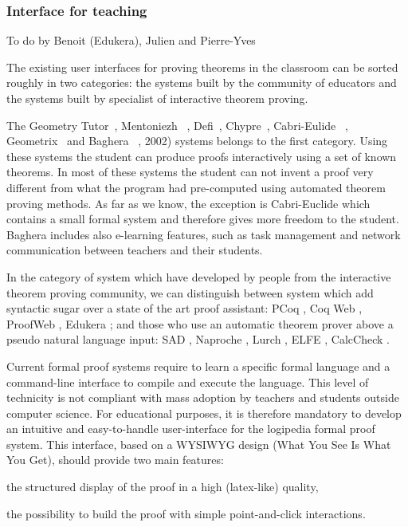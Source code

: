 \subsubsection*{Interface for teaching}

{\color{red} To do by Benoit (Edukera), Julien and Pierre-Yves}

The existing user interfaces for proving theorems in the classroom can be sorted roughly in two categories: 
the systems built by the community of educators and the systems built by specialist of interactive theorem proving.

The Geometry Tutor~\cite{anderson_geometry_1985}, Mentoniezh ~\cite{py_reconnaissance_1990},
Defi~\cite{ag-almouloud_ordinateur_1992}, Chypre~\cite{bernat_chypre:_1993}, Cabri-Eulide ~\cite{luengo_cabri-euclide:_1997}, Geometrix~\cite{gressier_geometrix_1988}  and Baghera ~\cite{balacheff_baghera_1999},
2002) systems belongs to the first category. Using these systems the
student can produce proofs interactively using a set of known theorems.
In most of these systems the student can not invent a proof very different
from what the program had pre-computed using automated theorem
proving methods. As far as we know, the exception is Cabri-Euclide
which contains a small formal system and therefore gives more freedom
to the student. Baghera includes also e-learning features, such as task
management and network communication between teachers and their
students.

In the category of system which have developed by people from the interactive theorem proving community, we can distinguish between system which add syntactic sugar over a state of the art proof assistant:
PCoq \cite{amerkad_mathematics_2001}, Coq Web \cite{blanc_proofs_2007}, ProofWeb \cite{kaliszyk_deduction_2008}, Edukera \cite{rognier_presentation_2016}; and those who use an automatic theorem prover above a pseudo natural language input:
SAD \cite{lyaletski_sad_2006}, Naproche \cite{cramer_naproche_2010}, Lurch \cite{carter_lurch:_nodate}, ELFE \cite{dore_elfe_2018}, CalcCheck \cite{kahl_calccheck:_2018}.

Current formal proof systems require to learn a specific formal
language and a command-line interface to compile and execute the
language. This level of technicity is not compliant with mass
adoption by teachers and students outside computer science. For
educational purposes, it is therefore mandatory to develop an
intuitive and easy-to-handle user-interface for the logipedia formal
proof system. This interface, based on a WYSIWYG design (What You See
Is What You Get), should provide two main features:
\begin{compactitem}
\item the structured display of the proof in a high (latex-like) quality,
\item the possibility to build the proof with simple point-and-click
  interactions.
\end{compactitem}


